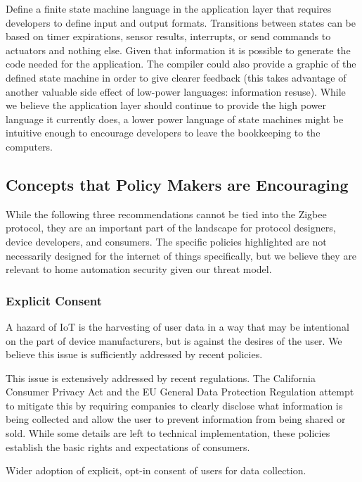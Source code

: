  Define a finite state machine language in the application layer that requires developers to define input and output formats. Transitions between states can be based on timer expirations, sensor results, interrupts, or send commands to actuators and nothing else. Given that information it is possible to generate the code needed for the application. The compiler could also provide a graphic of the defined state machine in order to give clearer feedback (this takes advantage of another valuable side effect of low-power languages: information resuse). While we believe the application layer should continue to provide the high power language it currently does, a lower power language of state machines might be intuitive enough to encourage developers to leave the bookkeeping to the computers.


\subsection{Concepts that Policy Makers are Encouraging}
While the following three recommendations cannot be tied into the Zigbee protocol, they are an important part of the landscape for protocol designers, device developers, and consumers. The specific policies highlighted are not necessarily designed for the internet of things specifically, but we believe they are relevant to home automation security given our threat model.

\subsubsection{Explicit Consent}
A hazard of IoT is the harvesting of user data in a way that may be intentional on the part of device manufacturers, but is against the desires of the user. We believe this issue is sufficiently addressed by recent policies.

 This issue is extensively addressed by recent regulations. The California Consumer Privacy Act and the EU General Data Protection Regulation attempt to mitigate this by requiring companies to clearly disclose what information is being collected and allow the user to prevent information from being shared or sold. While some details are left to technical implementation, these policies establish the basic rights and expectations of consumers. 

 Wider adoption of explicit, opt-in consent of users for data collection.


